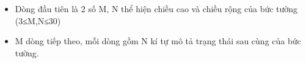 \begin{itemize}
	\item Dòng đầu tiên là 2 số M, N thể hiện chiều cao và chiều rộng của bức tường (3≤M,N≤30)
	\item M dòng tiếp theo, mỗi dòng gồm N kí tự mô tả trạng thái sau cùng của bức tường.
\end{itemize}

 

\